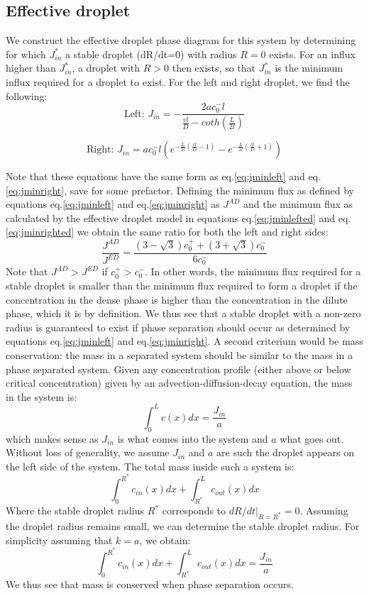 \documentclass{Dissertate}
\begin{document}
\hypertarget{effective-droplet-2}{%
\subsection{Effective droplet}\label{effective-droplet-2}}

We construct the effective droplet phase diagram for this system by
determining for which \(J^{*}_{in}\) a stable droplet (dR/dt=0) with
radius \(R=0\) exists. For an influx higher than \(J_{in}^*\), a droplet
with \(R>0\) then exists, so that \(J_{in}^*\) is the minimum influx
required for a droplet to exist. For the left and right droplet, we find
the following: \begin{equation}
\text{Left:  }J_{in} = - \frac{ 2a c_0^-l}{\frac{vl}{D}-coth(\frac{L}{2l})}
\label{eq:jminlefted}\end{equation}

\begin{equation}
\text{Right: } J_{in} =ac_0^-l\left(e^{-\frac{L}{2l}(\frac{vl}{D}-1)}-e^{-\frac{L}{2l}(\frac{vl}{D}+1)}\right)
\label{eq:jminrighted}\end{equation}

Note that these equations have the same form as eq.\ref{eq:jminleft}
and eq.\ref{eq:jminright}, save for some prefactor. Defining the
minimum flux as defined by equations eq.\ref{eq:jminleft} and
eq.\ref{eq:jminright} as \(J^{AD}\) and the minimum flux as calculated
by the effective droplet model in equations eq.\ref{eq:jminlefted} and
eq.\ref{eq:jminrighted} we obtain the same ratio for both the left and
right sides: \[
\frac{J^{AD}}{J^{ED}} = \frac{(3-\sqrt{3})c_0^++(3+\sqrt{3})c_0^-}{6c_0^-}
\] Note that \(J^{AD}>J^{ED}\) if \(c_0^+>c_0^-\). In other words, the
minimum flux required for a stable droplet is smaller than the minimum
flux required to form a droplet if the concentration in the dense phase
is higher than the concentration in the dilute phase, which it is by
definition. We thus see that a stable droplet with a non-zero radius is
guaranteed to exist if phase separation should occur as determined by
equations eq.\ref{eq:jminleft} and eq.\ref{eq:jminright}. A second
criterium would be mass conservation: the mass in a separated system
should be similar to the mass in a phase separated system. Given any
concentration profile (either above or below critical concentration)
given by an advection-diffusion-decay equation, the mass in the system
is: \[
\int_0^L c(x)dx = \frac{J_{in}}{a}
\] which makes sense as \(J_{in}\) is what comes into the system and
\(a\) what goes out. Without loss of generality, we assume \(J_{in}\)
and \(a\) are such the droplet appears on the left side of the system.
The total mass inside such a system is: \[
\int_0^{R^*}c_{in}(x)dx + \int_{R^*}^Lc_{out}(x)dx
\] Where the stable droplet radius \(R^*\) corresponds to
\(dR/dt|_{R=R^*}=0\). Assuming the droplet radius remains small, we can
determine the stable droplet radius. For simplicity assuming that
\(k=a\), we obtain: \[
\int_0^{R^*}c_{in}(x)dx + \int_{R^*}^Lc_{out}(x)dx=\frac{J_{in}}{a}
\] We thus see that mass is conserved when phase separation occurs.
\end{document}
